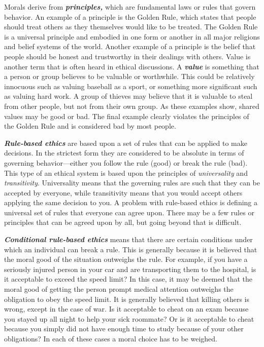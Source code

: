 Morals derive from \emph{\textbf{principles,}} which are fundamental
laws or rules that govern behavior. An example of a principle is the
Golden Rule, which states that people should treat others as they
themselves would like to be treated. The Golden Rule is a universal
principle and embodied in one form or another in all major religions and
belief systems of the world. Another example of a principle is the
belief that people should be honest and trustworthy in their dealings
with others. Value is another term that is often heard in ethical
discussions. A \emph{\textbf{value}} is something that a person or group
believes to be valuable or worthwhile. This could be relatively
innocuous such as valuing baseball as a sport, or something more
significant such as valuing hard work. A group of thieves may believe
that it is valuable to steal from other people, but not from their own
group. As these examples show, shared values may be good or bad. The
final example clearly violates the principles of the Golden Rule and is
considered bad by most people.

\textbf{\emph{Rule-based ethics}} are based upon a set of rules that can
be applied to make decisions. In the strictest form they are considered
to be absolute in terms of governing behavior---either you follow the
rule (good) or break the rule (bad). This type of an ethical system is
based upon the principles of \emph{universality} and
\emph{transitivity}. Universality means that the governing rules are
such that they can be accepted by everyone, while transitivity means
that you would accept others applying the same decision to you. A
problem with rule-based ethics is defining a universal set of rules that
everyone can agree upon. There may be a few rules or principles that can
be agreed upon by all, but going beyond that is difficult.

\emph{\textbf{Conditional rule-based ethics}} means that there are
certain conditions under which an individual can break a rule. This is
generally because it is believed that the moral good of the situation
outweighs the rule. For example, if you have a seriously injured person
in your car and are transporting them to the hospital, is it acceptable
to exceed the speed limit? In this case, it may be deemed that the moral
good of getting the person prompt medical attention outweighs the
obligation to obey the speed limit. It is generally believed that
killing others is wrong, except in the case of war. Is it acceptable to
cheat on an exam because you stayed up all night to help your sick
roommate? Or is it acceptable to cheat because you simply did not have
enough time to study because of your other obligations? In each of these
cases a moral choice has to be weighed.

